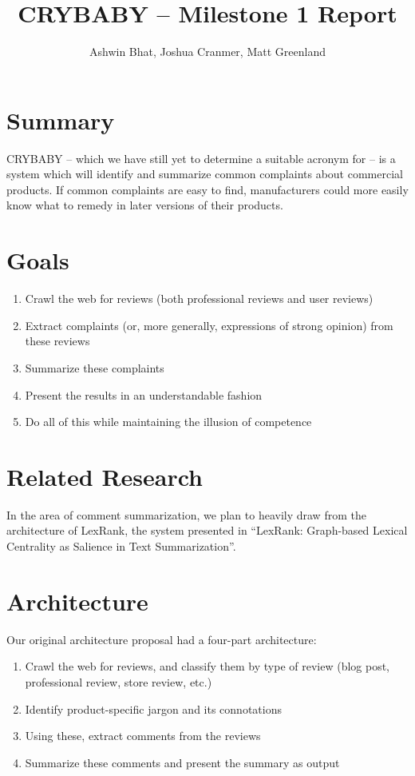 \documentclass{article}
\title{CRYBABY -- Milestone 1 Report}
\author{Ashwin Bhat, Joshua Cranmer, Matt Greenland}
\begin{document}
\maketitle
\tableofcontents
\section{Summary}
CRYBABY -- which we have still yet to determine a suitable acronym for -- is a
system which will identify and summarize common complaints about commercial
products. If common complaints are easy to find, manufacturers could more
easily know what to remedy in later versions of their products.

\section{Goals}
\begin{enumerate}
\item Crawl the web for reviews (both professional reviews and user reviews)
\item Extract complaints (or, more generally, expressions of strong opinion)
from these reviews
\item Summarize these complaints
\item Present the results in an understandable fashion
\item Do all of this while maintaining the illusion of competence
\end{enumerate}

\section{Related Research}
In the area of comment summarization, we plan to heavily draw from the
architecture of LexRank, the system presented in ``LexRank: Graph-based
Lexical Centrality as Salience in Text Summarization''.

\section{Architecture}
Our original architecture proposal had a four-part architecture:
\begin{enumerate}
\item Crawl the web for reviews, and classify them by type of review
(blog post, professional review, store review, etc.)
\item Identify product-specific jargon and its connotations
\item Using these, extract comments from the reviews
\item Summarize these comments and present the summary as output
\end{enumerate}
\end{document}

